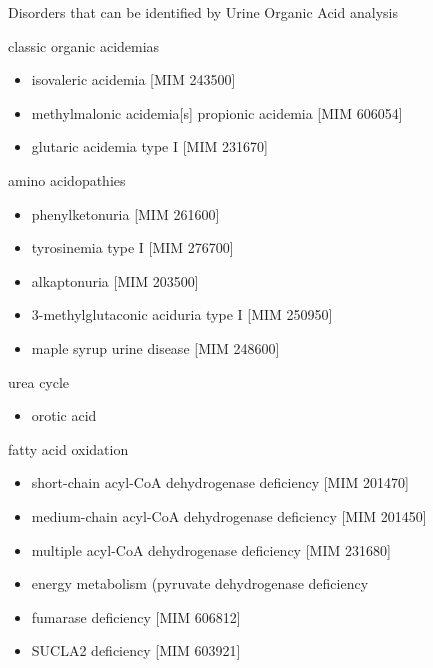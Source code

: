 \documentclass[presentation]{beamer}
\begin{document}
\begin{frame}[label={sec:orgheadline11}]{Disorders that can be identified by Urine Organic Acid analysis}
\begin{block}{classic organic acidemias}
\begin{itemize}
\item isovaleric acidemia [MIM 243500]
\item methylmalonic acidemia[s] propionic acidemia [MIM 606054]
\item glutaric acidemia type I [MIM 231670]
\end{itemize}
\end{block}
\begin{block}{amino acidopathies}
\begin{itemize}
\item phenylketonuria [MIM 261600]
\item tyrosinemia type I [MIM 276700]
\item alkaptonuria [MIM 203500]
\item 3-methylglutaconic aciduria type I [MIM 250950]
\item maple syrup urine disease [MIM 248600]
\end{itemize}
\end{block}
\begin{block}{urea cycle}
\begin{itemize}
\item orotic acid
\end{itemize}
\end{block}
\begin{block}{fatty acid oxidation}
\begin{itemize}
\item short-chain acyl-CoA dehydrogenase deficiency [MIM 201470]
\item medium-chain acyl-CoA dehydrogenase deficiency [MIM 201450]
\item multiple acyl-CoA dehydrogenase deficiency [MIM 231680]
\item energy metabolism (pyruvate dehydrogenase deficiency
\item fumarase deficiency [MIM 606812]
\item SUCLA2 deficiency [MIM 603921]
\end{itemize}
\end{block}
\end{frame}
\end{document}
